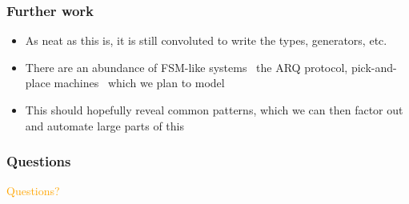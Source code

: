 \documentclass[compress,handout]{beamer}
\begin{document}


\begin{frame}
  \frametitle{Further work}

  \begin{itemize}
    \item<1-> As neat as this is, it is still convoluted to write the types,
              generators, etc.
    \item<2-> There are an abundance of FSM-like systems \textemdash\ the ARQ
              protocol, pick-and-place machines \textemdash\ which we plan to
              model
    \item<3-> This should hopefully reveal common patterns, which we can then
              factor out and automate large parts of this
  \end{itemize}

\end{frame}


\begin{frame}
  \frametitle{Questions}

  \begin{center}
    \textcolor<1>{orange}{\Large Questions?}
  \end{center}

\end{frame}
\end{document}
